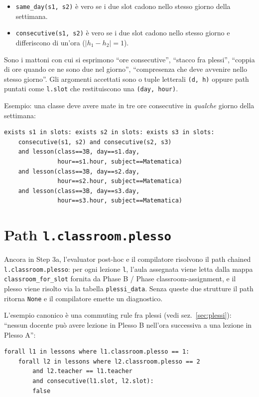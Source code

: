 \begin{itemize}
\item \texttt{same\_day(s1, s2)} \`e vero se i due slot cadono
  nello stesso giorno della settimana.
\item \texttt{consecutive(s1, s2)} \`e vero se i due slot cadono
  nello stesso giorno e differiscono di un'ora ($|h_1-h_2|=1$).
\end{itemize}

Sono i mattoni con cui si esprimono ``ore consecutive'',
``stacco fra plessi'', ``coppia di ore quando ce ne sono due
nel giorno'', ``compresenza che deve avvenire nello stesso
giorno''. Gli argomenti accettati sono o tuple letterali
\texttt{(d, h)} oppure path puntati come \texttt{l.slot} che
restituiscono una \texttt{(day, hour)}.

Esempio: una classe deve avere mate in tre ore consecutive in
\emph{qualche} giorno della settimana:
\begin{lstlisting}
exists s1 in slots: exists s2 in slots: exists s3 in slots:
    consecutive(s1, s2) and consecutive(s2, s3)
    and lesson(class==3B, day==s1.day,
               hour==s1.hour, subject==Matematica)
    and lesson(class==3B, day==s2.day,
               hour==s2.hour, subject==Matematica)
    and lesson(class==3B, day==s3.day,
               hour==s3.hour, subject==Matematica)
\end{lstlisting}

\section{Path \texttt{l.classroom.plesso}}
\label{sec:dsl-classroom-plesso}

Ancora in Step 3a, l'evaluator post-hoc e il compilatore
risolvono il path chained \texttt{l.classroom.plesso}: per ogni
lezione \texttt{l}, l'aula assegnata viene letta dalla mappa
\texttt{classroom\_for\_slot} fornita da Phase B / Phase
classroom-assignment, e il plesso viene risolto via la tabella
\texttt{plessi\_data}. Senza queste due strutture il path
ritorna \texttt{None} e il compilatore emette un diagnostico.

L'esempio canonico \`e una commuting rule fra plessi (vedi
sez.~\ref{sec:plessi}): ``nessun docente pu\`o avere lezione in
Plesso B nell'ora successiva a una lezione in Plesso A'':
\begin{lstlisting}
forall l1 in lessons where l1.classroom.plesso == 1:
    forall l2 in lessons where l2.classroom.plesso == 2
        and l2.teacher == l1.teacher
        and consecutive(l1.slot, l2.slot):
        false
\end{lstlisting}

